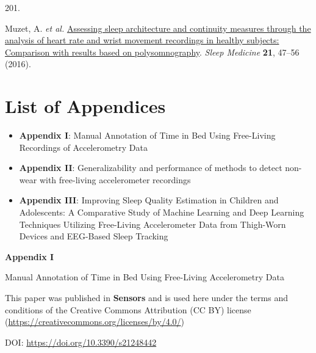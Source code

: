 \documentclass[
  10pt,
]{scrbook}
\newlength{\cslhangindent}
\newlength{\csllabelwidth}
\newlength{\cslentryspacingunit} %
\newenvironment{CSLReferences}[2] %
 {%
  \setlength{\parindent}{0pt}
  \ifodd #1
  \let\oldpar\par
  \def\par{\hangindent=\cslhangindent\oldpar}
  \fi
  \setlength{\parskip}{#2\cslentryspacingunit}
 }%
 {}
\newcommand{\CSLLeftMargin}[1]{\parbox[t]{\csllabelwidth}{#1}}
\newcommand{\CSLRightInline}[1]{\parbox[t]{\linewidth - \csllabelwidth}{#1}\break}
\let\originaltextbf\textbf
\renewcommand{\textbf}[1]{\textcolor{color1}{\textsf{\originaltextbf{#1}}}}
\begin{document}
\begin{CSLReferences}{0}{0}
\leavevmode{}%
\CSLLeftMargin{201. }%
\CSLRightInline{Muzet, A. \emph{et al.}
\href{https://doi.org/10.1016/j.sleep.2016.01.015}{Assessing sleep
architecture and continuity measures through the analysis of heart rate
and wrist movement recordings in healthy subjects: Comparison with
results based on polysomnography}. \emph{Sleep Medicine} \textbf{21},
47--56 (2016).}

\end{CSLReferences}

\hypertarget{list-of-appendices}{%
\chapter{List of Appendices}\label{list-of-appendices}}

\begin{itemize}
\item
  \textbf{Appendix I}: Manual Annotation of Time in Bed Using
  Free-Living Recordings of Accelerometry Data
\item
  \textbf{Appendix II}: Generalizability and performance of methods to
  detect non-wear with free-living accelerometer recordings
\item
  \textbf{Appendix III}: Improving Sleep Quality Estimation in Children
  and Adolescents: A Comparative Study of Machine Learning and Deep
  Learning Techniques Utilizing Free-Living Accelerometer Data from
  Thigh-Worn Devices and EEG-Based Sleep Tracking
\end{itemize}

\newpage

\begin{center}

\textbf{\textsf{\Huge Appendix I}}



\vspace{2cm}

\textsf{\Huge Manual Annotation of Time in Bed Using Free-Living Accelerometry Data}

\vspace{5cm}

This paper was published in \textbf{Sensors} and is used here under the terms and conditions of the Creative Commons Attribution (CC BY) license (\href{https://creativecommons.org/licenses/by/4.0/}{https://creativecommons.org/licenses/by/4.0/})

\vspace{1cm}

DOI: \href{https://doi.org/10.3390/s21248442}{https://doi.org/10.3390/s21248442}

\end{center}
\end{document}
